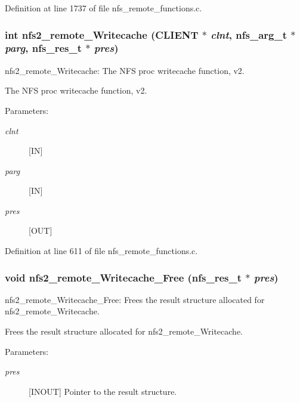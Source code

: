 Definition at line 1737 of file nfs\_\-remote\_\-functions.c.
\subsubsection{\setlength{\rightskip}{0pt plus 5cm}int nfs2\_\-remote\_\-Writecache (CLIENT $\ast$ {\em clnt}, nfs\_\-arg\_\-t $\ast$ {\em parg}, nfs\_\-res\_\-t $\ast$ {\em pres})}\label{group__NFSprocs_ga7}


nfs2\_\-remote\_\-Writecache: The NFS proc writecache function, v2.

The NFS proc writecache function, v2.

\begin{Desc}
\item[Parameters:]
\begin{description}
\item[{\em clnt}][IN] \item[{\em parg}][IN] \item[{\em pres}][OUT] \end{description}
\end{Desc}


Definition at line 611 of file nfs\_\-remote\_\-functions.c.
\subsubsection{\setlength{\rightskip}{0pt plus 5cm}void nfs2\_\-remote\_\-Writecache\_\-Free (nfs\_\-res\_\-t $\ast$ {\em pres})}\label{group__NFSprocs_ga69}


nfs2\_\-remote\_\-Writecache\_\-Free: Frees the result structure allocated for nfs2\_\-remote\_\-Writecache.

Frees the result structure allocated for nfs2\_\-remote\_\-Writecache.

\begin{Desc}
\item[Parameters:]
\begin{description}
\item[{\em pres}][INOUT] Pointer to the result structure. \end{description}
\end{Desc}


